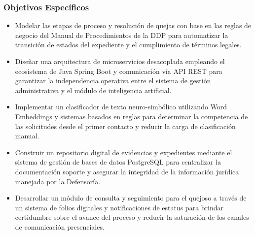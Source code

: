 \documentclass[12pt, letterpaper]{article}
\begin{document}
\subsubsection{Objetivos Específicos}
\begin{itemize}
    \item Modelar las etapas de proceso y resolución de quejas con base en las reglas de negocio del Manual de Procedimientos de la DDP para automatizar la transición de estados del expediente y el cumplimiento de términos legales.
    \item Diseñar una arquitectura de microservicios desacoplada empleando el ecosistema de Java Spring Boot y comunicación vía API REST para garantizar la independencia operativa entre el sistema de gestión administrativa y el módulo de inteligencia artificial.
    \item Implementar un clasificador de texto neuro-simbólico utilizando Word Embeddings y sistemas basados en reglas para determinar la competencia de las solicitudes desde el primer contacto y reducir la carga de clasificación manual.
    \item Construir un repositorio digital de evidencias y expedientes mediante el sistema de gestión de bases de datos PostgreSQL para centralizar la documentación soporte y asegurar la integridad de la información jurídica manejada por la Defensoría.
    \item Desarrollar un módulo de consulta y seguimiento para el quejoso a través de un sistema de folios digitales y notificaciones de estatus para brindar certidumbre sobre el avance del proceso y reducir la saturación de los canales de comunicación presenciales.
\end{itemize}
\end{document}
